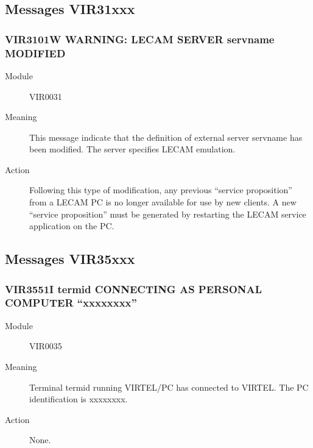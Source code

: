 \documentclass[letterpaper,10pt,english]{sphinxmanual}
\begin{document}
\subsection{Messages VIR31xxx}
\label{\detokenize{messages:messages-vir31xxx}}

\subsubsection{VIR3101W WARNING: LECAM SERVER servname MODIFIED}
\label{\detokenize{messages:vir3101w-warning-lecam-server-servname-modified}}\begin{description}
\item[{Module}] \leavevmode
VIR0031

\item[{Meaning}] \leavevmode
This message indicate that the definition of external server servname has been modified. The server specifies LECAM emulation.

\item[{Action}] \leavevmode
Following this type of modification, any previous “service proposition” from a LECAM PC is no longer available for use by new clients. A new “service proposition” must be generated by restarting the LECAM service application on the PC.

\end{description}


\subsection{Messages VIR35xxx}
\label{\detokenize{messages:messages-vir35xxx}}

\subsubsection{VIR3551I termid CONNECTING AS PERSONAL COMPUTER “xxxxxxxx”}
\label{\detokenize{messages:vir3551i-termid-connecting-as-personal-computer-xxxxxxxx}}\begin{description}
\item[{Module}] \leavevmode
VIR0035

\item[{Meaning}] \leavevmode
Terminal termid running VIRTEL/PC has connected to VIRTEL. The PC identification is xxxxxxxx.

\item[{Action}] \leavevmode
None.

\end{description}
\end{document}
